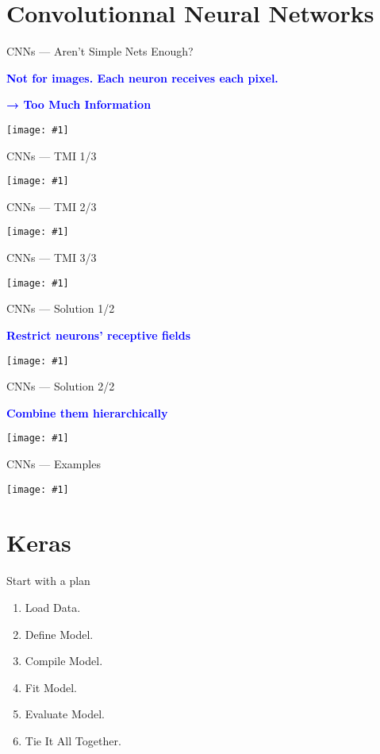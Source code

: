 \documentclass{beamer}
\newcommand\blue[1]{\textcolor{blue}{#1}}
\newcommand\cimg[1]{\vfill\centerline{\texttt{[image: \#1]}}\vfill}
\newcommand\cimgg[1]{\vfill\centerline{\texttt{[image: \#1]}}\vfill}
\newcommand\cimggg[1]{\vfill\centerline{\texttt{[image: \#1]}}\vfill}
\newcommand\vphrase[1]{\vfill\centerline{\large\bf\blue{#1}}\vfill}
\begin{document}
\section{Convolutionnal Neural Networks}
\label{sec:convnets}
\begin{frame}{CNNs --- Aren't Simple Nets Enough?}
  \vphrase{Not for images. Each neuron receives each pixel.}
  \vphrase{→ Too Much Information}
  \vfill
  \cimgg{tmi.jpg}
  \vfill
\end{frame}
\begin{frame}{CNNs --- TMI 1/3}
  \cimgg{park.jpg}
\end{frame}
\begin{frame}{CNNs --- TMI 2/3}
  \cimgg{station.jpg}
\end{frame}
\begin{frame}{CNNs --- TMI 3/3}
  \cimgg{street.jpg}
\end{frame}
\begin{frame}{CNNs --- Solution 1/2}
  \vphrase{Restrict neurons' receptive fields}
  \cimggg{kernel.jpg}
\end{frame}
\begin{frame}{CNNs --- Solution 2/2}
  \vphrase{Combine them hierarchically}
  \cimg{cnn.jpg}
\end{frame}
\begin{frame}{CNNs --- Examples}
  \cimg{hierarchical-features.png}
\end{frame}

\section{Keras}
\label{sec:keras}
\begin{frame}{Start with a plan}
\begin{enumerate}
\item Load Data.
\item Define Model.
\item Compile Model.
\item Fit Model.
\item Evaluate Model.
\item Tie It All Together.
\end{enumerate}
\end{frame}
\end{document}
